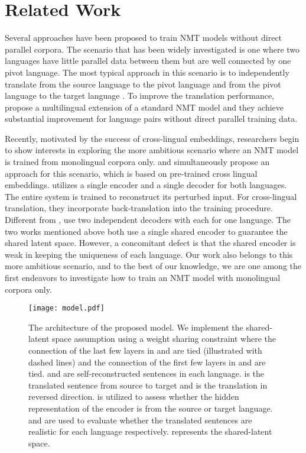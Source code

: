 \documentclass[11pt,a4paper]{article}
\begin{document}
\section{Related Work}
Several approaches have been proposed to train NMT models without direct parallel corpora. The scenario that has been widely investigated is one where two languages have little parallel data between them but are well connected by one pivot language. The most typical approach in this scenario is to independently translate from the source language to the pivot language and from the pivot language to the target language \cite{saha2016correlational,Cheng2017Joint}. To improve the translation performance, \citet{johnson2016google} propose a multilingual extension of a standard NMT model and they achieve substantial improvement for language pairs without direct parallel training data.

Recently, motivated by the success of cross-lingual embeddings, researchers begin to show interests in exploring the more ambitious scenario where an NMT model is trained from monolingual corpora only. \citet{Lample2017Unsupervised} and \citet{Artetxe2017Unsupervised} simultaneously propose an approach for this scenario, which is based on pre-trained cross lingual embeddings. \citet{Lample2017Unsupervised} utilizes a single encoder and a single decoder for both languages. The entire system is trained to reconstruct its perturbed input. For cross-lingual translation, they incorporate back-translation into the training procedure. Different from \cite{Lample2017Unsupervised}, \citet{Artetxe2017Unsupervised} use two independent decoders with each for one language. The two works mentioned above both use a single shared encoder to guarantee the shared latent space. However, a concomitant defect is that the shared encoder is weak in keeping the uniqueness of each language. Our work also belongs to this more ambitious scenario, and to the best of our knowledge, we are one among the first endeavors to investigate how to train an NMT model with monolingual corpora only.

\begin{figure*}[htb]
	\begin{center}
		\texttt{[image: model.pdf]}
	\end{center}
	\caption{The architecture of the proposed model. We implement the shared-latent space assumption using a weight sharing constraint where the connection of the last few layers in  and  are tied (illustrated with dashed lines) and the connection of the first few layers in  and  are tied.  and  are self-reconstructed sentences in each language.  is the translated sentence from source to target and  is the translation in reversed direction.  is utilized to assess whether the hidden representation of the encoder is from the source or target language.  and  are used to evaluate whether the translated sentences are realistic for each language respectively.  represents the shared-latent space.}
    \label{model architecture}	
\end{figure*}
\end{document}
